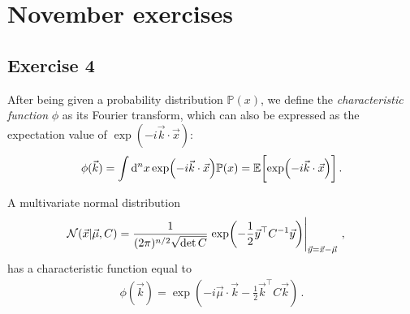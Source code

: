 \documentclass[main.tex]{subfiles}
\begin{document}
\section{November exercises}

\subsection{Exercise 4}


After being given a probability distribution \(\mathbb{P}(x)\), we define the \emph{characteristic function} \(\phi \) as its Fourier transform, which can also be expressed as the expectation value of \(\exp(- i \vec{k} \cdot \vec{x})\): 
%
\begin{align}
\phi (\vec{k}) = \int \dd[n]{x} \exp(- i \vec{k} \cdot \vec{x}) \mathbb{P}(x) 
= \mathbb{E} \qty[ \exp(- i \vec{k} \cdot \vec{x})]
\,.
\end{align}

\begin{claim}
A multivariate normal distribution 
%
\begin{align}
\mathcal{N}(\vec{x} | \vec{\mu}, C)
&= \frac{1}{(2\pi )^{n/2} \sqrt{\det C}} \eval{\exp(- \frac{1}{2} \vec{y}^{\top} C^{-1} \vec{y})}_{\vec{y} = \vec{x} - \vec{\mu}}
\,,
\end{align}
%
has a characteristic function equal to 
%
\begin{align}
\phi (\vec{k}) = \exp(- i \vec{\mu}\cdot \vec{k} - \frac{1}{2} \vec{k}^{\top} C \vec{k}) 
\,.
\end{align}
\end{claim}
\end{document}
